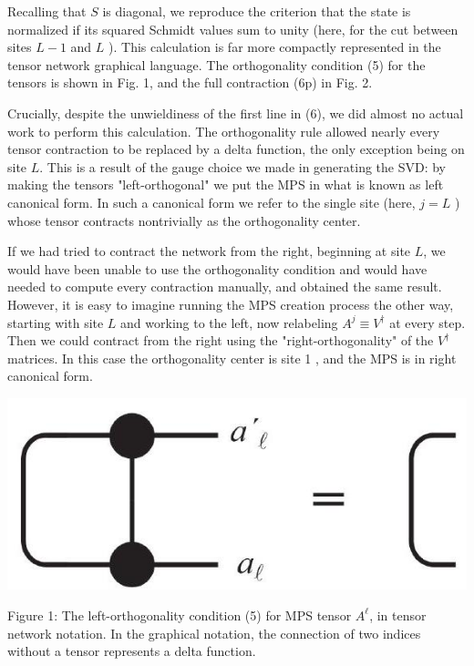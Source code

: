 \documentclass[12pt]{article}
\begin{document}
Recalling that $S$ is diagonal, we reproduce the criterion that the state is normalized if its squared Schmidt values sum to unity (here, for the cut between sites $L-1$ and $L$ ). This calculation is far more compactly represented in the tensor network graphical language. The orthogonality condition (5) for the tensors is shown in Fig. 1, and the full contraction (6p) in Fig. 2.

Crucially, despite the unwieldiness of the first line in (6), we did almost no actual work to perform this calculation. The orthogonality rule allowed nearly every tensor contraction to be replaced by a delta function, the only exception being on site $L$. This is a result of the gauge choice we made in generating the SVD: by making the tensors "left-orthogonal" we put the MPS in what is known as left canonical form. In such a canonical form we refer to the single site (here, $j=L$ ) whose tensor contracts nontrivially as the orthogonality center.

If we had tried to contract the network from the right, beginning at site $L$, we would have been unable to use the orthogonality condition and would have needed to compute every contraction manually, and obtained the same result. However, it is easy to imagine running the MPS creation process the other way, starting with site $L$ and working to the left, now relabeling $A^{j} \equiv V^{\dagger}$ at every step. Then we could contract from the right using the "right-orthogonality" of the $V^{\dagger}$ matrices. In this case the orthogonality center is site 1 , and the MPS is in right canonical form.

\begin{center}
\includegraphics[max width=\textwidth]{2024_05_17_c251ec82fd3768475949g-04}
\end{center}

Figure 1: The left-orthogonality condition (5) for MPS tensor $A^{\ell}$, in tensor network notation. In the graphical notation, the connection of two indices without a tensor represents a delta function.
\end{document}

